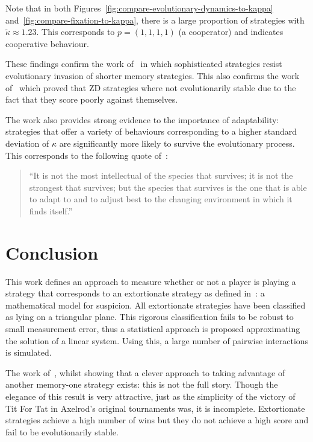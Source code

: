 \documentclass[a4paper]{article}
\begin{document}
Note that in both Figures~\ref{fig:compare-evolutionary-dynamics-to-kappa}
and~\ref{fig:compare-fixation-to-kappa}, there is a large proportion of
strategies with \(\tilde\kappa\approx1.23\). This corresponds to \(p=(1,1,1,1)\)
(a cooperator) and indicates cooperative behaviour.

These findings confirm the work of~\cite{Moran1707} in which sophisticated
strategies resist evolutionary invasion of shorter memory strategies. This also
confirms the work of~\cite{adami2013evolutionary, hilbe2015partners} which
proved that ZD strategies where not evolutionarily stable due to the fact that
they score poorly against themselves.

The work also provides strong evidence to the importance of adaptability:
strategies that offer a variety of behaviours corresponding to a higher standard
deviation of \(\kappa\) are significantly more likely to survive the
evolutionary process. This corresponds to the following quote
of~\cite{darwin1869origin}:

\begin{quote}
``It is not the most intellectual of the species that survives; it is not the
strongest that survives; but the species that survives is the one that is able
to adapt to and to adjust best to the changing environment in which it finds
itself.''
\end{quote}

\section{Conclusion}\label{sec:conclusion}

This work defines an approach to measure whether or not a player is playing a
strategy that corresponds to an extortionate strategy as defined
in~\cite{Press2012}: a mathematical model for suspicion. All extortionate
strategies have been classified as lying on a triangular plane.  This rigorous
classification fails to be robust to small measurement error, thus a statistical
approach is proposed approximating the solution of a linear system. Using this,
a large number of pairwise interactions is simulated.

The work of~\cite{Press2012}, whilst showing that a clever approach to taking
advantage of another memory-one strategy exists: this is not the full story.
Though the elegance of this result is very attractive, just as the simplicity of
the victory of Tit For Tat in Axelrod's original tournaments was, it is
incomplete.  Extortionate strategies achieve a high number of wins but they do
not achieve a high score and fail to be evolutionarily stable.
\end{document}
